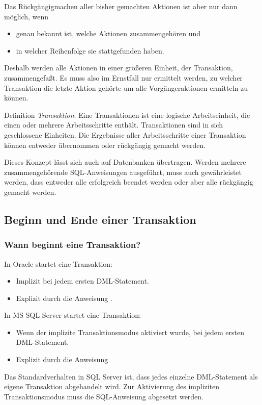       Das Rückgängigmachen aller bisher gemachten Aktionen ist aber nur dann
      möglich, wenn
      \begin{itemize}
        \item genau bekannt ist, welche Aktionen zusammengehören und
        \item  in welcher Reihenfolge sie stattgefunden haben.
      \end{itemize}
      Deshalb werden alle Aktionen in einer größeren Einheit, der
      Transaktion, zusammengefaßt. Es muss also im Ernstfall nur ermittelt
      werden, zu welcher Transaktion die letzte Aktion gehörte um alle
      Vorgängeraktionen ermitteln zu können.

      \begin{merke}
        Definition \textit{Transaktion}: Eine Transaktionen ist eine logische
        Arbeitseinheit, die einen oder mehrere Arbeitsschritte enthält.
        Transaktionen sind in sich geschlossene Einheiten. Die Ergebnisse aller
        Arbeitsschritte einer Transaktion können entweder übernommen oder
        rückgängig gemacht werden.
      \end{merke}
      Dieses Konzept lässt sich auch auf Datenbanken übertragen. Werden
      mehrere zusammengehörende SQL-Anweisungen ausgeführt, muss auch
      gewährleistet werden, dass entweder alle erfolgreich beendet werden oder
      aber alle rückgängig gemacht werden.
      \subsection{Beginn und Ende einer Transaktion}
        \subsubsection{Wann beginnt eine Transaktion?}
          In Oracle startet eine Transaktion:
          \begin{itemize}
            \item Implizit bei jedem ersten DML-Statement.
            \item Explizit durch die Anweisung .
          \end{itemize}
          In MS SQL Server startet eine Transaktion:
          \begin{itemize}
            \item Wenn der implizite Transaktionsmodus aktiviert wurde, bei
            jedem ersten DML-State\-ment.
            \item Explizit durch die Anweisung 
          \end{itemize}
          \begin{merke}
            Das Standardverhalten in SQL Server ist, dass jedes einzelne
            DML-Statement als eigene Transaktion abgehandelt wird. Zur
            Ak\-ti\-vie\-rung des impliziten Transaktionsmodus muss die
            SQL-Anweisung  abgesetzt
            werden.
          \end{merke}
